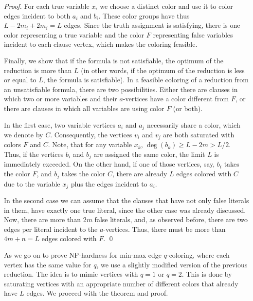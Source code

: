 \documentclass[runningheads, a4paper]{llncs}
\begin{document}
\begin{proof}
For each true variable $x_i$ we choose a distinct color and use it to color edges incident to both $a_i$ and $b_i$. These color groups have thus $L - 2m_i + 2m_i = L$ edges. Since the truth assignment is satisfying, there is one color representing a true variable and the color $F$ representing false variables incident to each clause vertex, which makes the coloring feasible.

Finally, we show that if the formula is not satisfiable, the optimum of the reduction is more than $L$ (in other words, if the optimum of the reduction is less or equal to $L$, the formula is satisfiable). In a feasible coloring of a reduction from an unsatisfiable formula, there are two possibilities. Either there are clauses in which two or more variables and their $a$-vertices have a color different from $F$, or there are clauses in which all variables are using color $F$ (or both).

In the first case, two variable vertices $a_i$ and $a_j$ necessarily share a color, which we denote by $C$. Consequently, the vertices $v_i$ and $v_j$ are both saturated with colors $F$ and $C$. Note, that for any variable $x_k$, $\deg(b_k) \geq L - 2m > L/2$. Thus, if the vertices $b_i$ and $b_j$ are assigned the same color, the limit $L$ is immediately exceeded. On the other hand, if one of those vertices, say, $b_i$ takes the color $F$, and $b_j$ takes the color $C$, there are already $L$ edges colored with $C$ due to the variable $x_j$ plus the edges incident to $a_i$.

In the second case we can assume that the clauses that have not only false literals in them, have exactly one true literal, since the other case was already discussed. Now, there are more than $2m$ false literals, and, as observed before, there are two edges per literal incident to the $a$-vertices. Thus, there must be more than $4m + n = L$ edges colored with $F$. \qed
\end{proof}

As we go on to prove NP-hardness for min-max edge $q$-coloring, where each vertex has the same value for $q$, we use a slightly modified version of the previous reduction. The idea is to mimic vertices with $q=1$ or $q=2$. This is done by saturating vertices with an appropriate number of different colors that already have $L$ edges. We proceed with the theorem and proof.
\end{document}

